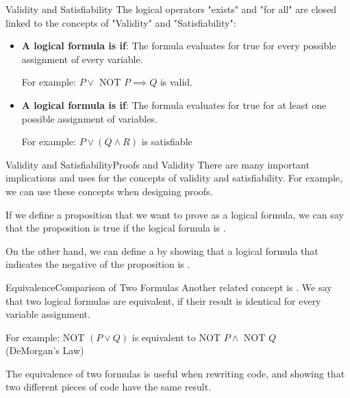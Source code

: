 
\begin{frame}{Validity and Satisfiability}
  The logical operators "exists" and "for all" are closed linked to the concepts of "Validity" and "Satisfiability":\bigskip

  \begin{itemize}
    \item {\bf A logical formula is  if}: The formula evaluates for true for every possible assignment of every variable.\medskip

    For example: $P \lor \text{ NOT } P \implies Q$ is valid.\bigskip

    \item {\bf A logical formula is  if}: The formula evaluates for true for at least one possible assignment of variables.\medskip

    For example: $P \lor (Q \land R)$ is satisfiable
  \end{itemize}\bigskip
\end{frame}

\begin{frame}{Validity and Satisfiability}{Proofs and Validity}
  There are many important implications and uses for the concepts of validity and satisfiability. For example, we can use these concepts when designing proofs.\bigskip

  If we define a proposition that we want to prove as a logical formula, we can say that the proposition is true if the logical formula is .\bigskip

  On the other hand, we can define a  by showing that a logical formula that indicates the negative of the proposition is .
\end{frame}


\begin{frame}{Equivalence}{Comparison of Two Formulas}
  Another related concept is . We say that two logical formulas are equivalent, if their result is identical for every variable assignment.\vfill

  For example: $\text{NOT }(P \lor Q)$ is equivalent to $\text{NOT } P \land \text{ NOT } Q$\\
  \hfill (DeMorgan's Law)\vfill

  The equivalence of two formulas is useful when rewriting code, and showing that two different pieces of code have the same result.
\end{frame}

